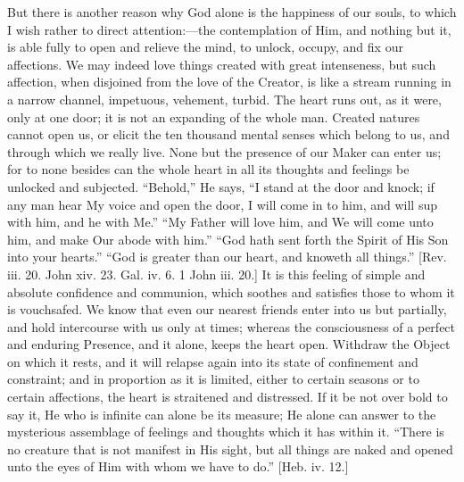 But there is another reason why God alone is the happiness of our
souls, to which I wish rather to direct attention:—the contemplation
of Him, and nothing but it, is able fully to open and relieve the
mind, to unlock, occupy, and fix our affections. We may indeed love
things created with great intenseness, but such affection, when
disjoined from the love of the Creator, is like a stream running in a
narrow channel, impetuous, vehement, turbid. The heart runs out, as it
were, only at one door; it is not an expanding of the whole man.
Created natures cannot open us, or elicit the ten thousand mental
senses which belong to us, and through which we really live. None but
the presence of our Maker can enter us; for to none besides can the
whole heart in all its thoughts and feelings be unlocked and
subjected. ``Behold,'' He says, ``I stand at the door and
knock; if any man hear My voice and open the door, I will come in to
him, and will sup with him, and he with Me.'' ``My Father will
love him, and We will come unto him, and make Our abode with
him.'' ``God hath sent forth the Spirit of His Son into your
hearts.'' ``God is greater than our heart, and knoweth all
things.'' [Rev. iii. 20. John xiv. 23. Gal. iv. 6. 1 John iii.
20.] It is this feeling of simple and absolute confidence and
communion, which soothes and satisfies those to whom it is vouchsafed.
We know that even our nearest friends enter into us but partially, and
hold intercourse with us only at times; whereas the consciousness of a
perfect and enduring Presence, and it alone, keeps the heart open.
Withdraw the Object on which it rests, and it will relapse again into
its state of confinement and constraint; and in proportion as it is
limited, either to certain seasons or to certain affections, the heart
is straitened and distressed. If it be not over bold to say it, He who
is infinite can alone be its measure; He alone can answer to the
mysterious assemblage of feelings and thoughts which it has within it.
``There is no creature that is not manifest in His sight, but all
things are naked and opened unto the eyes of Him with whom we have to
do.'' [Heb. iv. 12.]

